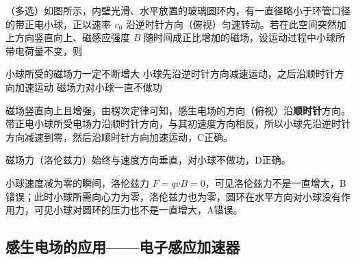 \noindent{}

\begin{liti}
（多选）如图所示，内壁光滑、水平放置的玻璃圆环内，有一直径略小于环管口径的带正电小球，正以速率 $v_0$ 沿逆时针方向（俯视）匀速转动。若在此空间突然加上方向竖直向上、磁感应强度 $B$ 随时间成正比增加的磁场，设运动过程中小球所带电荷量不变，则

\noindent\begin{minipage}[c]{0.66\linewidth}
%
{小球所受的磁场力一定不断增大}%
{小球先沿逆时针方向减速运动，之后沿顺时针方向加速运动}%
{磁场力对小球一直不做功}
\end{minipage}\hfill
\noindent\begin{minipage}[c]{0.3\linewidth}
\centering
{}
\end{minipage}
\begin{jiexi}[2.5cm]
磁场竖直向上且增强，由楞次定律可知，感生电场的方向（俯视）沿\textbf{顺时针}方向。带正电小球所受电场力沿顺时针方向，与其初速度方向相反，所以小球先沿逆时针方向减速到零，然后沿顺时针方向加速运动，C正确。

磁场力（洛伦兹力）始终与速度方向垂直，对小球不做功，D正确。

小球速度减为零的瞬间，洛伦兹力 $F=qvB=0$，可见洛伦兹力不是一直增大，B错误；此时小球所需向心力为零，洛伦兹力也为零，圆环在水平方向对小球没有作用力，可见小球对圆环的压力也不是一直增大，A错误。
\end{jiexi}
\end{liti}

\subsection{感生电场的应用——电子感应加速器}


